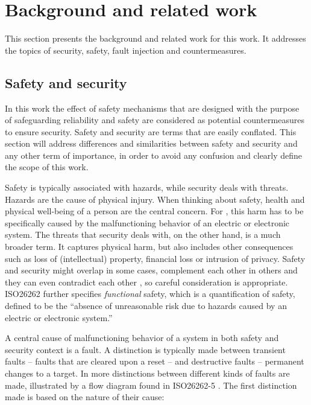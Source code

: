 \documentclass[10pt]{article}
\begin{document}
\newpage
\section{Background and related work }
\label{sec:background}

  This section presents the background and related work for this work. It addresses the topics of security, safety, fault injection and countermeasures.

  \subsection{Safety and security }

    In this work the effect of safety mechanisms that are designed with the purpose of safeguarding reliability and safety are considered as potential countermeasures to ensure security. Safety and security are terms that are easily conflated. This section will address differences and similarities between safety and security and any other term of importance, in order to avoid any confusion and clearly define the scope of this work.

    Safety is typically associated with hazards, while security deals with threats. Hazards are the cause of physical injury. When thinking about safety, health and physical well-being of a person are the central concern. For \citet{iso26262-1}, this harm has to be specifically caused by the malfunctioning behavior of an electric or electronic system. The threats that security deals with, on the other hand, is a much broader term. It captures physical harm, but also includes other consequences such as loss of (intellectual) property, financial loss or intrusion of privacy. Safety and security might overlap in some cases, complement each other in others and they can even contradict each other \cite{burton_automotive_2012}, so careful consideration is appropriate. ISO26262 further specifies \emph{functional} safety, which is a quantification of safety, defined to be the \enquote{absence of unreasonable risk due to hazards caused by an electric or electronic system.} \cite{iso26262-1}

    A central cause of malfunctioning behavior of a system in both safety and security context is a fault. A distinction is typically made between transient faults -- faults that are cleared upon a reset -- and destructive faults -- permanent changes to a target. \cite{bar-el_sorcerers_2006} 
    In \citet{iso26262-1} more distinctions between different kinds of faults are made, illustrated by a flow diagram found in ISO26262-5 \cite{iso26262-5}. The first distinction made is based on the nature of their cause:
\end{document}

